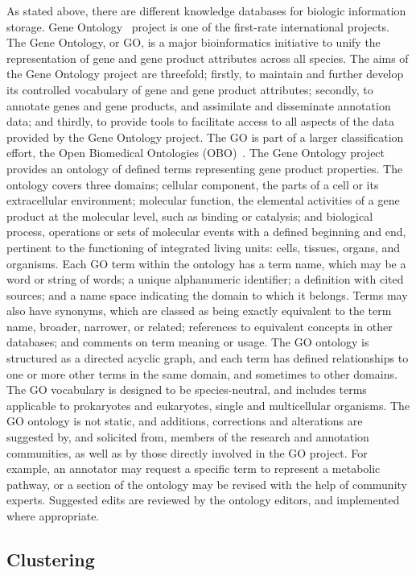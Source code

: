\documentclass[a4paper,oneside]{article}
\begin{document}
As stated above, there are different knowledge databases for biologic information storage. Gene Ontology~\cite{GO_website} project is one of the first-rate international projects. The Gene Ontology, or GO, is a major bioinformatics initiative to unify the representation of gene and gene product attributes across all species. The aims of the Gene Ontology project are threefold; firstly, to maintain and further develop its controlled vocabulary of gene and gene product attributes; secondly, to annotate genes and gene products, and assimilate and disseminate annotation data; and thirdly, to provide tools to facilitate access to all aspects of the data provided by the Gene Ontology project. The GO is part of a larger classification effort, the Open Biomedical Ontologies (OBO)~\cite{OBO}. The Gene Ontology project provides an ontology of defined terms representing gene product properties. The ontology covers three domains; cellular component, the parts of a cell or its extracellular environment; molecular function, the elemental activities of a gene product at the molecular level, such as binding or catalysis; and biological process, operations or sets of molecular events with a defined beginning and end, pertinent to the functioning of integrated living units: cells, tissues, organs, and organisms. Each GO term within the ontology has a term name, which may be a word or string of words; a unique alphanumeric identifier; a definition with cited sources; and a name space indicating the domain to which it belongs. Terms may also have synonyms, which are classed as being exactly equivalent to the term name, broader, narrower, or related; references to equivalent concepts in other databases; and comments on term meaning or usage. The GO ontology is structured as a directed acyclic graph, and each term has defined relationships to one or more other terms in the same domain, and sometimes to other domains. The GO vocabulary is designed to be species-neutral, and includes terms applicable to prokaryotes and eukaryotes, single and multicellular organisms. The GO ontology is not static, and additions, corrections and alterations are suggested by, and solicited from, members of the research and annotation communities, as well as by those directly involved in the GO project. For example, an annotator may request a specific term to represent a metabolic pathway, or a section of the ontology may be revised with the help of community experts. Suggested edits are reviewed by the ontology editors, and implemented where appropriate.


\subsection{Clustering}
\label{clustering}
\end{document}
